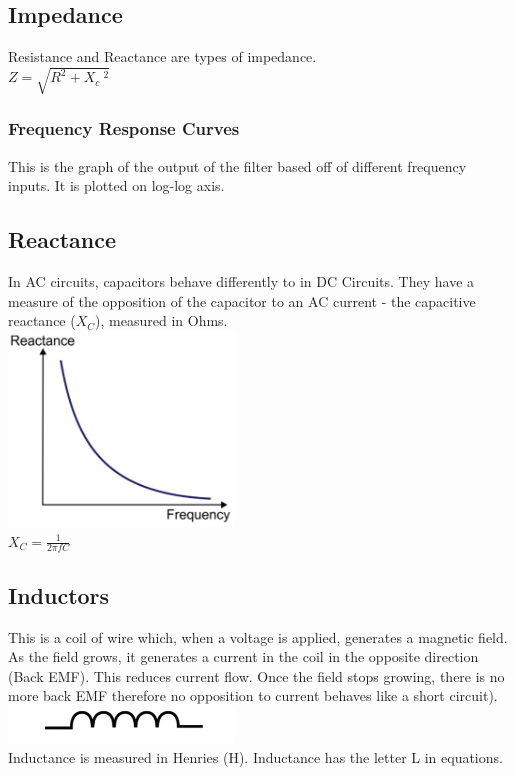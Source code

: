 \documentclass[a4paper,11pt, twocolumn]{article}
\begin{document}
\subsection{Impedance}
Resistance and Reactance are types of impedance. \\
$\displaystyle Z = \sqrt{R^2 + X_c\ ^2}$
\subsubsection{Frequency Response Curves}
This is the graph of the output of the filter based off of different frequency inputs. It is plotted on log-log axis.
\subsection{Reactance}
In AC circuits, capacitors behave differently to in DC Circuits. They have a measure of the opposition of the capacitor to an AC current - the capacitive reactance ($X_C$), measured in Ohms.\\
\includegraphics[width=0.45\textwidth]{reactance.jpg}\\
$\displaystyle X_C = \frac{1}{2 \pi f C}$
\subsection{Inductors}
This is a coil of wire which, when a voltage is applied, generates a magnetic field. As the field grows, it generates a current in the coil in the opposite direction (Back EMF). This reduces current flow. Once the field stops growing, there is no more back EMF therefore no opposition to current behaves like a short circuit).\\
\includegraphics[width=0.45\textwidth]{inductor.jpg}\\
Inductance is measured in Henries (H). Inductance has the letter L in equations.
\end{document}
